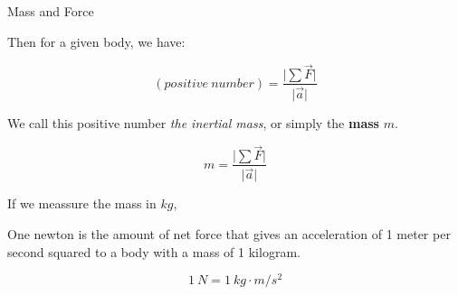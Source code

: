 \documentclass[]{beamer}
\begin{document}

\begin{frame}

Mass and Force

\vspace{5mm}
Then for a given body, we have:
\pause

\begin{equation*}
  (positive~number)= \frac{\vert\sum\vec{F}\vert}{\vert\vec{a}\vert}
\end{equation*}
\pause

We call this positive number \textit{the inertial mass}, or simply the
\textbf{mass} $m$.

\pause

\begin{equation}
 \boxed{m= \frac{\vert\sum\vec{F}\vert}{\vert\vec{a}\vert}}
\end{equation}

     \end{frame}



\begin{frame}

If we meassure the mass in $kg$, 
\vspace{5mm}

\pause
One newton is the amount of net force that gives an acceleration of 1 meter per
second squared to a body with a mass of 1 kilogram.
\pause
\vspace{5mm}

\begin{equation}
  \boxed{1~N=1~kg\cdot m/s^ 2}
 \end{equation}
  
\end{frame}


\end{document}
